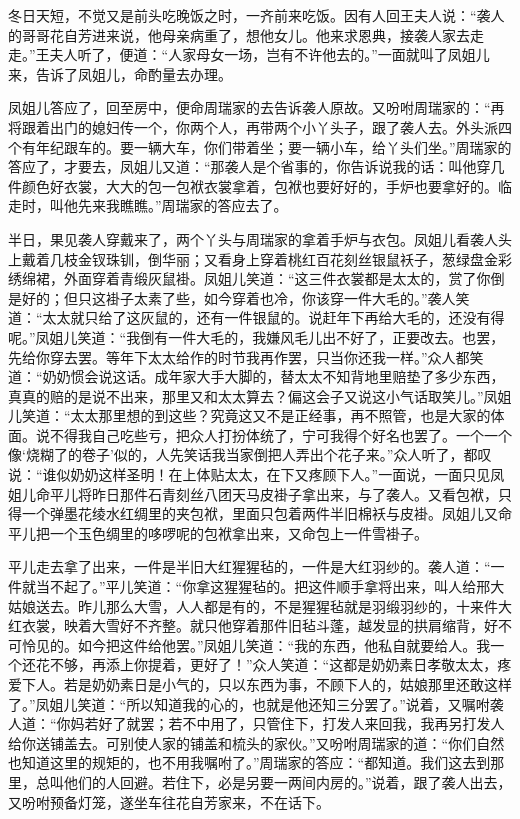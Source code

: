 冬日天短，不觉又是前头吃晚饭之时，一齐前来吃饭。因有人回王夫人说：“袭人的哥哥花自芳进来说，他母亲病重了，想他女儿。他来求恩典，接袭人家去走走。”王夫人听了，便道：“人家母女一场，岂有不许他去的。”一面就叫了凤姐儿来，告诉了凤姐儿，命酌量去办理。

凤姐儿答应了，回至房中，便命周瑞家的去告诉袭人原故。又吩咐周瑞家的：“再将跟着出门的媳妇传一个，你两个人，再带两个小丫头子，跟了袭人去。外头派四个有年纪跟车的。要一辆大车，你们带着坐；要一辆小车，给丫头们坐。”周瑞家的答应了，才要去，凤姐儿又道：“那袭人是个省事的，你告诉说我的话：叫他穿几件颜色好衣裳，大大的包一包袱衣裳拿着，包袱也要好好的，手炉也要拿好的。临走时，叫他先来我瞧瞧。”周瑞家的答应去了。

半日，果见袭人穿戴来了，两个丫头与周瑞家的拿着手炉与衣包。凤姐儿看袭人头上戴着几枝金钗珠钏，倒华丽；又看身上穿着桃红百花刻丝银鼠袄子，葱绿盘金彩绣绵裙，外面穿着青缎灰鼠褂。凤姐儿笑道：“这三件衣裳都是太太的，赏了你倒是好的；但只这褂子太素了些，如今穿着也冷，你该穿一件大毛的。”袭人笑道：“太太就只给了这灰鼠的，还有一件银鼠的。说赶年下再给大毛的，还没有得呢。”凤姐儿笑道：“我倒有一件大毛的，我嫌风毛儿出不好了，正要改去。也罢，先给你穿去罢。等年下太太给作的时节我再作罢，只当你还我一样。”众人都笑道：“奶奶惯会说这话。成年家大手大脚的，替太太不知背地里赔垫了多少东西，真真的赔的是说不出来，那里又和太太算去？偏这会子又说这小气话取笑儿。”凤姐儿笑道：“太太那里想的到这些？究竟这又不是正经事，再不照管，也是大家的体面。说不得我自己吃些亏，把众人打扮体统了，宁可我得个好名也罢了。一个一个像‘烧糊了的卷子’似的，人先笑话我当家倒把人弄出个花子来。”众人听了，都叹说：“谁似奶奶这样圣明！在上体贴太太，在下又疼顾下人。”一面说，一面只见凤姐儿命平儿将昨日那件石青刻丝八团天马皮褂子拿出来，与了袭人。又看包袱，只得一个弹墨花绫水红绸里的夹包袱，里面只包着两件半旧棉袄与皮褂。凤姐儿又命平儿把一个玉色绸里的哆啰呢的包袱拿出来，又命包上一件雪褂子。

平儿走去拿了出来，一件是半旧大红猩猩毡的，一件是大红羽纱的。袭人道：“一件就当不起了。”平儿笑道：“你拿这猩猩毡的。把这件顺手拿将出来，叫人给邢大姑娘送去。昨儿那么大雪，人人都是有的，不是猩猩毡就是羽缎羽纱的，十来件大红衣裳，映着大雪好不齐整。就只他穿着那件旧毡斗蓬，越发显的拱肩缩背，好不可怜见的。如今把这件给他罢。”凤姐儿笑道：“我的东西，他私自就要给人。我一个还花不够，再添上你提着，更好了！”众人笑道：“这都是奶奶素日孝敬太太，疼爱下人。若是奶奶素日是小气的，只以东西为事，不顾下人的，姑娘那里还敢这样了。”凤姐儿笑道：“所以知道我的心的，也就是他还知三分罢了。”说着，又嘱咐袭人道：“你妈若好了就罢；若不中用了，只管住下，打发人来回我，我再另打发人给你送铺盖去。可别使人家的铺盖和梳头的家伙。”又吩咐周瑞家的道：“你们自然也知道这里的规矩的，也不用我嘱咐了。”周瑞家的答应：“都知道。我们这去到那里，总叫他们的人回避。若住下，必是另要一两间内房的。”说着，跟了袭人出去，又吩咐预备灯笼，遂坐车往花自芳家来，不在话下。

